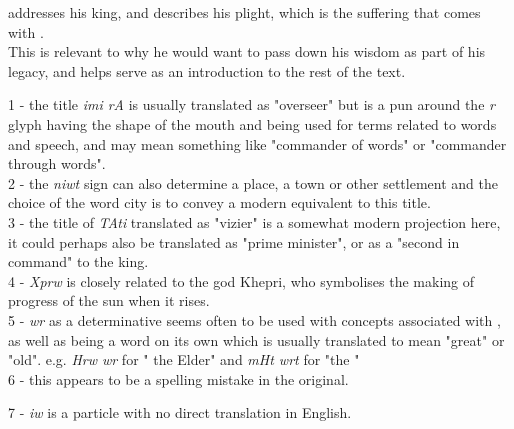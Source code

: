 \vspace*{\fill}

 addresses his king,  and describes his plight, which is the suffering that comes with .\\

This is relevant to why he would want to pass down his wisdom as part of his legacy, and helps serve as an introduction to the rest of the text.\\

\vspace*{\fill}

1 - the title \textit{imi rA} is usually translated as "overseer" but is a pun around the \textit{r} glyph having the shape of the mouth and being used for terms related to words and speech, and may mean something like "commander of words" or "commander through words".\\

2 - the \textit{niwt} sign can also determine a place, a town or other settlement and the choice of the word city is to convey a modern equivalent to this title.\\

3 - the title of \textit{TAti} translated as "vizier" is a somewhat modern projection here, it could perhaps also be translated as "prime minister", or as a "second in command" to the king.\\

4 - \textit{Xprw} is closely related to the god Khepri, who symbolises the making of progress of the sun when it rises.\\

5 - \textit{wr} as a determinative seems often to be used with concepts associated with \textit{}, as well as being a word on its own which is usually translated to mean "great" or "old". e.g. \textit{Hrw wr} for " the Elder" and \textit{mHt wrt} for "the " \\

6 - this appears to be a spelling mistake in the original.

7 - \textit{iw} is a particle with no direct translation in English.

\vspace*{\fill}

\pagebreak

\vspace*{\fill}

